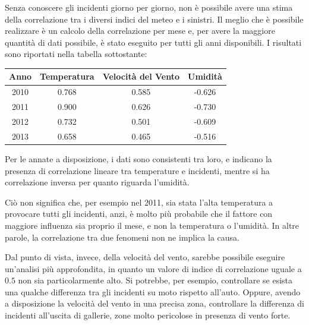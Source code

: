 \documentclass[a4paper]{report}
\begin{document}
Senza conoscere gli incidenti giorno per giorno, non è possibile avere una stima della 
correlazione tra i diversi indici del meteo e i sinistri.
Il meglio che è possibile realizzare è un calcolo della correlazione per mese e, per 
avere la maggiore quantità di dati possibile, è stato eseguito per tutti gli 
anni disponibili.
I risultati sono riportati nella tabella sottostante: 

\begin{center}
    \def\arraystretch{1.5}%
    \begin{tabular}{ |c|c|c|c| } 
    \hline
    Anno & Temperatura & Velocità del Vento & Umidità \\ 
    \hline
    \rowcolor{TableGray}
    2010 & 0.768 & 0.585 & -0.626 \\
    2011 & 0.900 & 0.626 & -0.730 \\
    \rowcolor{TableGray}
    2012 & 0.732 & 0.501 & -0.609 \\
    2013 & 0.658 & 0.465 & -0.516 \\
    \hline
    \end{tabular}
\end{center}

Per le annate a disposizione, i dati sono consistenti tra loro, e indicano la presenza di 
correlazione lineare tra temperature e incidenti, mentre si ha correlazione inversa per quanto 
riguarda l'umidità.

Ciò non significa che, per esempio nel 2011, sia stata l'alta temperatura a provocare 
tutti gli incidenti, anzi, è molto più probabile che il fattore con maggiore 
influenza sia proprio il mese, e non la temperatura o l'umidità.
In altre parole, la correlazione tra due fenomeni non ne implica la causa.

Dal punto di vista, invece, della velocità del vento, sarebbe possibile eseguire 
un'analisi più approfondita, in quanto un valore di indice di correlazione uguale 
a $0.5$ non sia particolarmente alto.
Si potrebbe, per esempio, controllare se esista una qualche differenza tra gli incidenti su 
moto rispetto all'auto. 
Oppure, avendo a disposizione la velocità del vento in una precisa zona, controllare 
la differenza di incidenti all'uscita di gallerie, zone molto pericolose 
in presenza di vento forte.


\printbibliography
\end{document}
